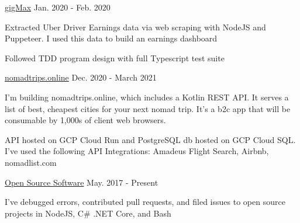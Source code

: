 \begin{cventries}
  \cventry
    {} %
    {\href{https://github.com/geofflangenderfer/gigMax}{gigMax}} %
    {} %
    {Jan. 2020 - Feb. 2020} %
    {
      \begin{cvitems} %
      \item {Extracted Uber Driver Earnings data via web scraping with NodeJS and Puppeteer. I used this data to build an earnings dashboard}
      \item {Followed TDD program design with full Typescript test suite}
      \end{cvitems}
    }
  \cventry
    {} %
    {\href{https://nomadtrips.online}{nomadtrips.online}} %
    {} %
    {Dec. 2020 - March 2021} %
    {
      \begin{cvitems} %
      \item {I'm building nomadtrips.online, which includes a Kotlin REST API. It serves a list of best, cheapest cities for your next nomad trip. It's a b2c app that will be consumable by 1,000s of client web browsers.}
      \item {API hosted on GCP Cloud Run and PostgreSQL db hosted on GCP Cloud SQL. I've used the following API Integrations: Amadeus Flight Search, Airbnb, nomadlist.com}
      \end{cvitems}
    }
  \cventry
    {} %
    {\href{https://github.com/geofflangenderfer}{Open Source Software}} %
    {} %
    {May. 2017 - Present} %
    {
      \begin{cvitems} %
      \item {I've debugged errors, contributed pull requests, and filed issues to open source projects in NodeJS, C\# .NET Core, and Bash}
      \end{cvitems}
    }

\end{cventries}
